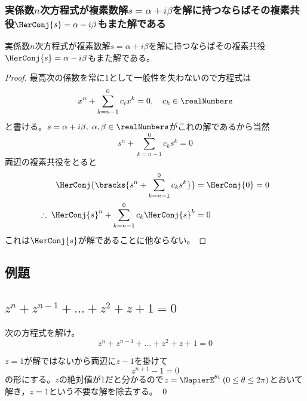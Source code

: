             \subsubsection{実係数\texorpdfstring{$n$}{n}次方程式が複素数解\texorpdfstring{$s=\alpha+i\beta$}{s=α+iβ}を解に持つならばその複素共役\texorpdfstring{$\HerConj{s} = \alpha-i\beta$}{}もまた解である}
                \begin{shadebox}
                    実係数$n$次方程式が複素数解$s=\alpha+i\beta$を解に持つならばその複素共役$\HerConj{s} = \alpha-i\beta$もまた解である。
                \end{shadebox}
                \begin{proof}
                    最高次の係数を常に1として一般性を失わないので方程式は
                    \[x^n + \sum_{k=n-1}^{0}{c_ix^k} = 0,\quad c_k \in \realNumbers\]
                    と書ける。$s=\alpha+i\beta,\;\alpha,\beta\in\realNumbers$がこれの解であるから当然
                    \[s^n + \sum_{k=n-1}^{0}{c_ks^k} = 0\]
                    両辺の複素共役をとると
                    \begin{align*}
                        \HerConj{\bracks{s^n + \sum_{k=n-1}^{0}{c_ks^k}}} &= \HerConj{0} = 0\\
                        \therefore \; {\HerConj{s}}^n + \sum_{k=n-1}^{0}{c_k{\HerConj{s}}^k} &= 0
                    \end{align*}
                    これは$\HerConj{s}$が解であることに他ならない。
                \end{proof}
        \subsection{例題}
            \subsection{\texorpdfstring{$z^n+z^{n-1}+\dots+z^2+z+1 = 0$}{zのべき乗の和=0}}
                \begin{shadebox}
                    次の方程式を解け。
                    \[z^n+z^{n-1}+\dots+z^2+z+1 = 0\]
                \end{shadebox}
                \begin{solution}
                    \quad\par
                    $z=1$が解ではないから両辺に$z-1$を掛けて
                    \[z^{n+1}-1=0\]
                    の形にする。$z$の絶対値が1だと分かるので$z=\NapierE^{\theta i}\; (0\leq\theta \leq 2\pi)$とおいて解き，$z=1$という不要な解を除去する。
                    \qed
                \end{solution}